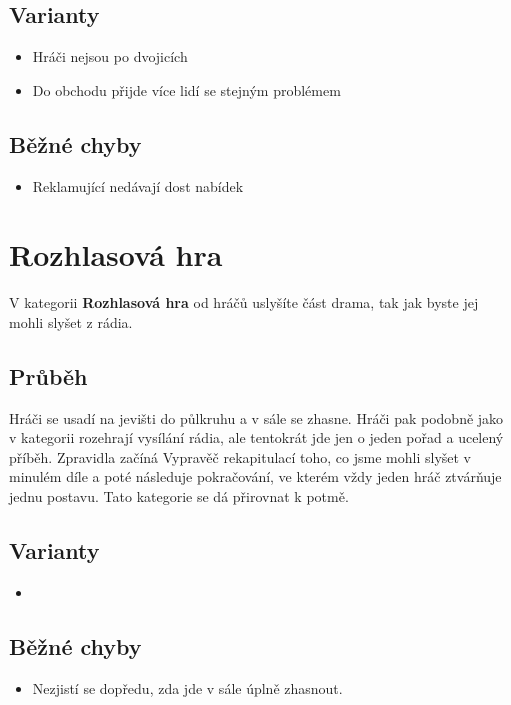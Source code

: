 \documentclass[main.tex]{subfiles}
\begin{document}
\subsection{ Varianty } \begin{itemize}
\item  Hráči nejsou po dvojicích
\item  Do obchodu přijde více lidí se stejným problémem
\end{itemize}
 
\subsection{ Běžné chyby } \begin{itemize}
\item  Reklamující nedávají dost nabídek
\end{itemize}
 
 
 
 
 
\needspace{5cm} \section{Rozhlasová hra} \label{rozhlasová hra}  
 
 
V kategorii \textbf{Rozhlasová hra}{} od hráčů uslyšíte část drama, tak jak byste jej mohli slyšet z rádia. 
 
\subsection{Průběh} Hráči se usadí na jevišti do půlkruhu a v sále se zhasne. Hráči pak podobně jako v kategorii  rozehrají vysílání rádia, ale tentokrát jde jen o jeden pořad a ucelený příběh. Zpravidla začíná Vypravěč rekapitulací toho, co jsme mohli slyšet v minulém díle a poté následuje pokračování, ve kterém vždy jeden hráč ztvárňuje jednu postavu. Tato kategorie se dá přirovnat k  potmě. 
 
\subsection{ Varianty } \begin{itemize}
\item {}
\end{itemize}
 
\subsection{ Běžné chyby } \begin{itemize}
\item Nezjistí se dopředu, zda jde v sále úplně zhasnout.
\end{itemize}
 
\end{document}
